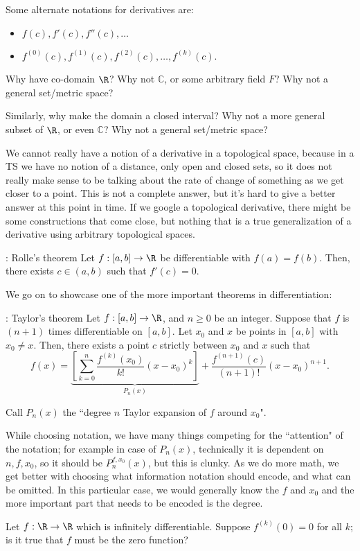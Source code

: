 \begin{notation}
	Some alternate notations for derivatives are:
	\begin{itemize}
		\item \(f(c),f'(c),f''(c),\dots\)
		
		\item \(f^{(0)}(c),f^{(1)}(c),f^{(2)}(c),\dots, f^{(k)}(c)\).
	\end{itemize}
\end{notation}
\begin{fft}
	Why have co-domain \(\R\)? Why not \(\mathbb{C}\), or some arbitrary field \(F\)? Why not a general set/metric space?
	
	\medskip
	
	Similarly, why make the domain a closed interval? Why not a more general subset of \(\R\), or even \(\mathbb{C}\)? Why not a general set/metric space?
\end{fft}
We cannot really have a notion of a derivative in a topological space, because in a TS we have no notion of a distance, only open and closed sets, so it does not really make sense to be talking about the rate of change of something as we get closer to a point. This is not a complete answer, but it's hard to give a better answer at this point in time. If we google a topological derivative, there might be some constructions that come close, but nothing that is a true generalization of a derivative using arbitrary topological spaces.

\begin{ntheorem}{: Rolle's theorem}
	Let \(f:[a,b]\to \R\) be differentiable with \(f(a)=f(b)\). Then, there exists \(c\in(a,b)\) such that \(f'(c)=0\).
\end{ntheorem}

We go on to showcase one of the more important theorems in differentiation:

\begin{ntheorem}{: Taylor's theorem}
	Let \(f:[a,b]\to\R\), and \(n\geq 0\) be an integer. Suppose that \(f\) is \((n+1)\) times differentiable on \([a,b]\). Let \(x_0\) and \(x\) be points in \([a,b]\) with \(x_0\neq x\). Then, there exists a point \(c\) strictly between \(x_0\) and \(x\) such that 
	\begin{equation*}
		f(x)=\underbrace{\left[\sum_{k=0}^{n}\frac{f^{(k)}(x_0)}{k!}(x-x_0)^k\right]}_{P_n(x)}+\frac{f^{(n+1)}(c)}{(n+1)!}(x-x_0)^{n+1}.
	\end{equation*}
\end{ntheorem}
Call \(P_n(x)\) the ``degree \(n\) Taylor expansion of \(f\) around \(x_0\)".
\begin{note}
	While choosing notation, we have many things competing for the ``attention" of the notation; for example in case of \(P_n(x)\), technically it is dependent on \(n,f,x_0\), so it should be \(P_n^{f,x_0}(x)\), but this is clunky. As we do more math, we get better with choosing what information notation should encode, and what can be omitted. In this particular case, we would generally know the \(f\) and \(x_0\) and the more important part that needs to be encoded is the degree.
\end{note}

\begin{fft}
	Let \(f:\R\to\R\) which is infinitely differentiable. Suppose \(f^{(k)}(0)=0\) for all \(k\); is it true that \(f\) must be the zero function?	
\end{fft}